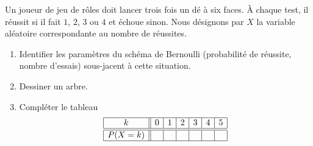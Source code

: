 
\begin{exercice}\label{exoPremiere-0086}

    Un joueur de jeu de rôles doit lancer trois fois un dé à six faces. À chaque test, il réussit si il fait \( 1\), \( 2\), \( 3\) ou \( 4\) et échoue sinon. Nous désignons par \( X\) la variable aléatoire correspondante au nombre de réussites.
    \begin{enumerate}
        \item
            Identifier les paramètres du schéma de Bernoulli (probabilité de réussite, nombre d'essais) sous-jacent à cette situation.
        \item
            Dessiner un arbre.
        \item
            Compléter le tableau
            \begin{equation*}
                \begin{array}[]{|c||c|c|c|c|c|c|}
                    \hline
                    k&0&1&2&3&4&5\\
                    \hline\hline
                    P(X=k)&&&&&&\\
                    \hline
                \end{array}
            \end{equation*}
    \end{enumerate}

\end{exercice}
